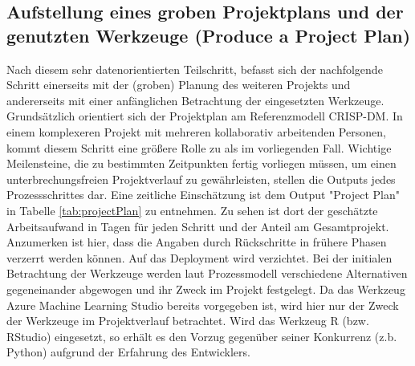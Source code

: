 \subsection{Aufstellung eines groben Projektplans und der genutzten Werkzeuge (Produce a Project Plan)} \label{subsec:projectPlan}
Nach diesem sehr datenorientierten Teilschritt, befasst sich der nachfolgende Schritt einerseits mit der (groben) Planung des weiteren Projekts und andererseits mit einer anfänglichen Betrachtung der eingesetzten Werkzeuge. Grundsätzlich orientiert sich der Projektplan am Referenzmodell CRISP-DM. In einem komplexeren Projekt mit mehreren kollaborativ arbeitenden Personen, kommt diesem Schritt eine größere Rolle zu als im vorliegenden Fall. Wichtige Meilensteine, die zu bestimmten Zeitpunkten fertig vorliegen müssen, um einen unterbrechungsfreien Projektverlauf zu gewährleisten, stellen die Outputs jedes Prozessschrittes dar. Eine zeitliche Einschätzung ist dem Output "Project Plan" in Tabelle \ref{tab:projectPlan} zu entnehmen. Zu sehen ist dort der geschätzte Arbeitsaufwand in Tagen für jeden Schritt und der Anteil am Gesamtprojekt. Anzumerken ist hier, dass die Angaben durch Rückschritte in frühere Phasen verzerrt werden können. Auf das Deployment wird verzichtet.  \newline
Bei der initialen Betrachtung der Werkzeuge werden laut Prozessmodell verschiedene Alternativen gegeneinander abgewogen und ihr Zweck im Projekt festgelegt. Da das Werkzeug Azure Machine Learning Studio bereits vorgegeben ist, wird hier nur der Zweck der Werkzeuge im Projektverlauf betrachtet. Wird das Werkzeug R (bzw. RStudio) eingesetzt, so erhält es den Vorzug gegenüber seiner Konkurrenz (z.b. Python) aufgrund der Erfahrung des Entwicklers.


